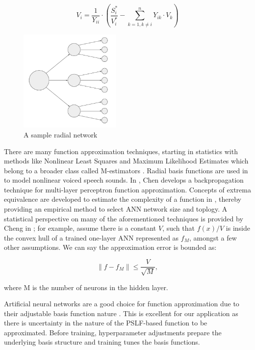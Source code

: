 \documentclass[conference]{IEEEtran}
\begin{document}
\begin{equation} V_i = \frac{1}{Y_{ii}} \cdot \left(\frac{S_i^*}{V_i^*} - \displaystyle\sum_{k=1,k \neq i}^{n} Y_{ik} \cdot V_k\right) \label{form:nlpfeqn} \end{equation}

\begin{figure}[h]
	\centering
	\includegraphics[width=5cm]{radialnetwork.pdf}
	\caption{A sample radial network}
	\label{fig:radnetwork}
\end{figure}

There are many function approximation techniques, starting in statistics with methods like Nonlinear Least Squares and Maximum Likelihood Estimates which belong to a broader class called M-estimators \cite{haya2000}. Radial basis functions are used in \cite{mann1999} to model nonlinear voiced speech sounds. In \cite{chen1994}, Chen develops a backpropagation technique for multi-layer perceptron function approximation. Concepts of extrema equivalence are developed to estimate the complexity of a function in \cite{zhang2004}, thereby providing an empirical method to select ANN network size and toplogy. A statistical perspective on many of the aforementioned techniques is provided by Cheng in \cite{cheng1994}; for example, assume there is a constant $V$, such that $f(x)/V$ is inside the convex hull of a trained one-layer ANN represented as $f_{M}$, amongst a few other assumptions. We can say the approximation error is bounded as:

\begin{equation} \|f - f_{M}\| \leqslant \frac{V}{\sqrt{M}}, \label{form:1layerannbound} \end{equation}

\noindent where M is the number of neurons in the hidden layer.

Artificial neural networks are a good choice for function approximation due to their adjustable basis function nature \cite{barr1994}. This is excellent for our application as there is uncertainty in the nature of the PSLF-based function to be approximated. Before training, hyperparameter adjustments prepare the underlying basis structure and training tunes the basis functions.
\end{document}
